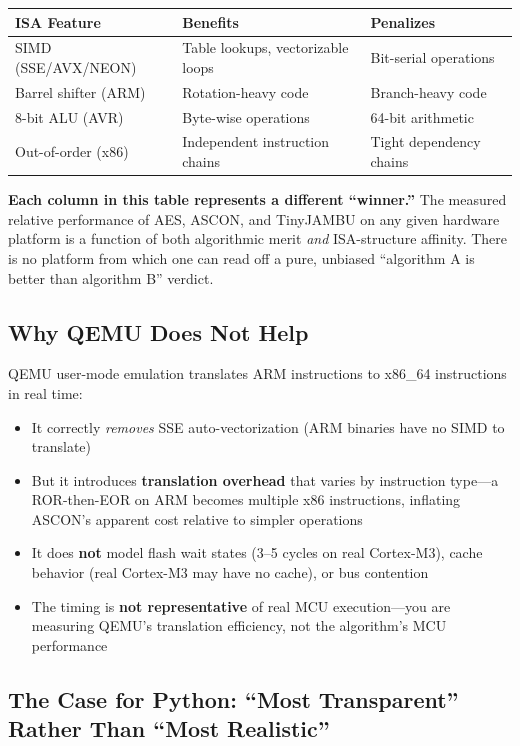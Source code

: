 \documentclass[11pt,a4paper]{article}
\begin{document}
\begin{center}
\begin{tabular}{lll}
\toprule
\textbf{ISA Feature} & \textbf{Benefits} & \textbf{Penalizes} \\
\midrule
SIMD (SSE/AVX/NEON) & Table lookups, vectorizable loops & Bit-serial operations \\
Barrel shifter (ARM) & Rotation-heavy code & Branch-heavy code \\
8-bit ALU (AVR) & Byte-wise operations & 64-bit arithmetic \\
Out-of-order (x86) & Independent instruction chains & Tight dependency chains \\
\bottomrule
\end{tabular}
\end{center}

\textbf{Each column in this table represents a different ``winner.''} The measured relative performance of AES, ASCON, and TinyJAMBU on any given hardware platform is a function of both algorithmic merit \textit{and} ISA-structure affinity. There is no platform from which one can read off a pure, unbiased ``algorithm A is better than algorithm B'' verdict.

\subsection{Why QEMU Does Not Help}

QEMU user-mode emulation translates ARM instructions to x86\_64 instructions in real time:
\begin{itemize}
    \item It correctly \textit{removes} SSE auto-vectorization (ARM binaries have no SIMD to translate)
    \item But it introduces \textbf{translation overhead} that varies by instruction type---a ROR-then-EOR on ARM becomes multiple x86 instructions, inflating ASCON's apparent cost relative to simpler operations
    \item It does \textbf{not} model flash wait states (3--5 cycles on real Cortex-M3), cache behavior (real Cortex-M3 may have no cache), or bus contention
    \item The timing is \textbf{not representative} of real MCU execution---you are measuring QEMU's translation efficiency, not the algorithm's MCU performance
\end{itemize}

\subsection{The Case for Python: ``Most Transparent'' Rather Than ``Most Realistic''}
\end{document}

